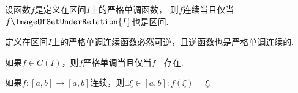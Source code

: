 \begin{corollary}
设函数\(f\)是定义在区间\(I\)上的严格单调函数，
则\(f\)连续当且仅当\(f\ImageOfSetUnderRelation{I}\)也是区间.
\end{corollary}

\begin{corollary}
定义在区间\(I\)上的严格单调连续函数必然可逆，且逆函数也是严格单调连续的.
\end{corollary}

\begin{corollary}
如果\(f \in C(I)\)，则\(f\)严格单调当且仅当\(f^{-1}\)存在.
\end{corollary}

\begin{corollary}
如果\(f\colon[a,b]\to[a,b]\)连续，则\(\exists\xi\in[a,b]: f(\xi)=\xi\).
\end{corollary}

